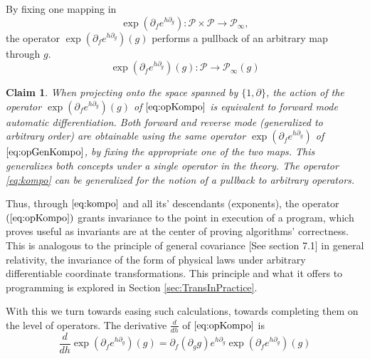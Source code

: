 \documentclass[smallcondensed]{svjour3}
\newcommand{\dP}{\mathcal{P}}
\newcommand{\D}{\partial}
\newtheorem{trditev}{Claim}[section]
\begin{document}
 By fixing one mapping in  
 \begin{equation}\label{eq:opGenKompo}
\exp(\D_fe^{h\D_g}): \dP\times\dP\to\dP_\infty,
 \end{equation}
 the operator $\exp(\D_fe^{h\D_g})(g)$ performs a pullback of an arbitrary map through $g$. 
  \begin{equation}\label{eq:opKompo}
  \exp(\D_fe^{h\D_g})(g): \dP\to\dP_\infty(g)
  \end{equation}
 \begin{trditev}\label{trd:reverseForward}
 When projecting onto the space spanned by $\{1,\D\}$, the action of the operator $\exp(\D_fe^{h\D_g})(g)$ of $\eqref{eq:opKompo}$ is equivalent to forward \cite{PcAD} mode automatic differentiation. Both forward \cite{PcAD} and reverse \cite{ReverseAD} mode (generalized to arbitrary order) are obtainable using the same operator $\exp(\D_fe^{h\D_g})$ of $\eqref{eq:opGenKompo}$, by fixing the appropriate one of the two maps. This generalizes both concepts under a single operator in the theory. The operator \eqref{eq:kompo} can be generalized for the notion of a pullback to arbitrary operators.
 \end{trditev}
 
 Thus, through $\eqref{eq:kompo}$ and all its' descendants (exponents), the operator $(\ref{eq:opKompo})$ grants invariance to the point in execution of a program, which proves useful as invariants are at the center of proving algorithms' correctness. This is analogous to the principle of general covariance \cite{GeneralCovariance}[See section 7.1] in general relativity, the invariance of the form of physical laws under arbitrary differentiable coordinate transformations. This principle and what it offers to programming is explored in Section \ref{sec:TransInPractice}.
 
 With this we turn towards easing such calculations, towards completing them on the level of operators. The derivative $\frac{d}{dh}$ of $\eqref{eq:opKompo}$ is
 \begin{equation}\label{eq:dexp}
 \frac{d}{dh}\exp(\D_fe^{h\D_g})(g)=\D_f(\D_gg)e^{h\D_g}\exp(\D_fe^{h\D_g})(g)
 \end{equation}
 
\end{document}
